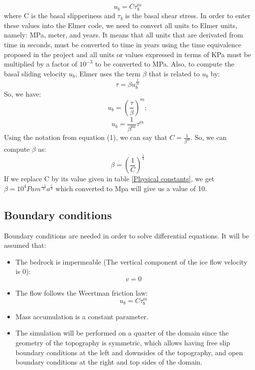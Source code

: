 \documentclass{article}
\begin{document}
\begin{equation}
	u_b = C\tau _b^m
\end{equation}
where C is the basal slipperiness and $\tau _b$ is the basal shear stress.
In order to enter these values into the Elmer code, we need to convert all units to Elmer units, namely: MPa, meter, and years. It means that all units that are derivated from time in seconds, must be converted to time in years using the time equivalence proposed in the project and all units or values expressed in terms of KPa must be multiplied by a factor of $10^{-3}$ to be converted to MPa.
Also, to compute the basal sliding velocity $u_b$, Elmer uses the term $\beta$ that is related to $u_b$ by:
\begin{equation}
	\tau = \beta u_b^{\frac{1}{m}}
\end{equation}
So, we have:
\begin{equation}
	u_b = (\frac{\tau}{\beta})^m;
\end{equation}
\begin{equation}
	u_b = \frac{1}{\beta^m} \tau^m
\end{equation}
Using the notation from equation (1), we can say that $C=  \frac{1}{\beta^m}$. So, we can compute $\beta$ as:
\begin{equation}
	\beta=(\frac{1}{C})^{\frac{1}{3}}
\end{equation}
If we replace C by its value given in table \ref{Physical constants}, we get $\beta= 10^4 Pa m^{\frac{-1}{3}} a^{\frac{1}{3}}$ which converted to Mpa will give us a value of 10.

\subsection{Boundary conditions}
Boundary conditions are needed in order to solve differential equations. It will be assumed that:
\begin{itemize}
	\item The bedrock is impermeable (The vertical component of the ice flow velocity is 0):
	\begin{equation}
		v = 0
	\end{equation}
	\item The flow follows the Weertman friction law:
	\begin{equation}
		u_b = C\tau_b^m
	\end{equation}
	\item Mass accumulation is a constant parameter.
	\item The simulation will be performed on a quarter of the domain since the geometry of the topography is symmetric, which allows having free slip boundary conditions at the left and downsides of the topography, and open boundary conditions at the right and top sides of the domain. 
\end{itemize}
\end{document}
